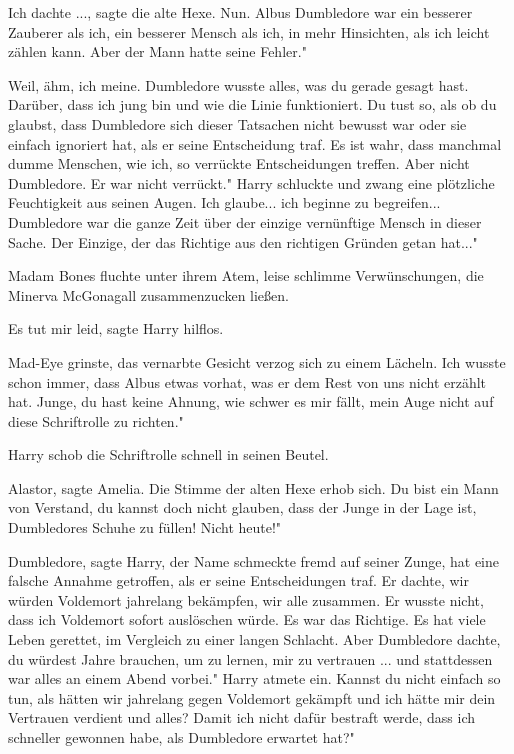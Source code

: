 \glqq Ich dachte ...\grqq{}, sagte die alte Hexe. \glqq Nun. Albus Dumbledore
war ein besserer Zauberer als ich, ein besserer Mensch als ich, in mehr
Hinsichten, als ich leicht zählen kann. Aber der Mann hatte seine Fehler."

\glqq Weil, ähm, ich meine. Dumbledore wusste alles, was du gerade gesagt hast.
Darüber, dass ich jung bin und wie die Linie funktioniert. Du tust so, als ob du
glaubst, dass Dumbledore sich dieser Tatsachen nicht bewusst war oder sie
einfach ignoriert hat, als er seine Entscheidung traf. Es ist wahr, dass
manchmal dumme Menschen, wie ich, so verrückte Entscheidungen treffen. Aber
nicht Dumbledore. Er war nicht verrückt." Harry schluckte und zwang eine
plötzliche Feuchtigkeit aus seinen Augen. \glqq Ich glaube... ich beginne zu
begreifen... Dumbledore war die ganze Zeit über der einzige vernünftige Mensch
in dieser Sache. Der Einzige, der das Richtige aus den richtigen Gründen getan
hat..."

Madam Bones fluchte unter ihrem Atem, leise schlimme Verwünschungen, die Minerva
McGonagall zusammenzucken ließen.

\glqq Es tut mir leid\grqq{}, sagte Harry hilflos.

Mad-Eye grinste, das vernarbte Gesicht verzog sich zu einem Lächeln. \glqq Ich
wusste schon immer, dass Albus etwas vorhat, was er dem Rest von uns nicht
erzählt hat. Junge, du hast keine Ahnung, wie schwer es mir fällt, mein Auge
nicht auf diese Schriftrolle zu richten."

Harry schob die Schriftrolle schnell in seinen Beutel.

\glqq Alastor\grqq{}, sagte Amelia. Die Stimme der alten Hexe erhob sich. \glqq
Du bist ein Mann von Verstand, du kannst doch nicht glauben, dass der Junge in
der Lage ist, Dumbledores Schuhe zu füllen! Nicht heute!"

\glqq Dumbledore\grqq{}, sagte Harry, der Name schmeckte fremd auf seiner Zunge,
\glqq hat eine falsche Annahme getroffen, als er seine Entscheidungen traf. Er
dachte, wir würden Voldemort jahrelang bekämpfen, wir alle zusammen. Er wusste
nicht, dass ich Voldemort sofort auslöschen würde. Es war das Richtige. Es hat
viele Leben gerettet, im Vergleich zu einer langen Schlacht. Aber Dumbledore
dachte, du würdest Jahre brauchen, um zu lernen, mir zu vertrauen ... und
stattdessen war alles an einem Abend vorbei." Harry atmete ein. \glqq Kannst du
nicht einfach so tun, als hätten wir jahrelang gegen Voldemort gekämpft und ich
hätte mir dein Vertrauen verdient und alles? Damit ich nicht dafür bestraft
werde, dass ich schneller gewonnen habe, als Dumbledore erwartet hat?"

